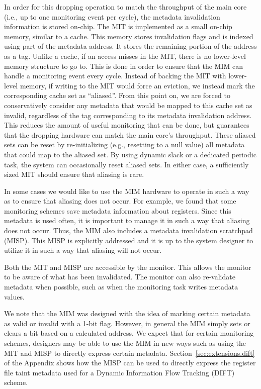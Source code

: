 In order for this dropping operation to match the throughput of the main core
(i.e., up to one monitoring event per cycle), the metadata invalidation
information is stored on-chip. The MIT is implemented as a small on-chip
memory, similar to a cache. This memory stores invalidation flags and is
indexed using part of the metadata address. It stores the remaining portion of
the address as a tag. Unlike a cache, if an access misses in the MIT, there is
no lower-level memory structure to go to. This is done in order to ensure that
the MIM can handle a monitoring event every cycle. Instead of backing the MIT
with lower-level memory, if writing to the MIT would force an eviction, we
instead mark the corresponding cache set as ``aliased''. From this point on, we
are forced to conservatively consider any metadata that would be mapped to this
cache set as invalid, regardless of the tag corresponding to its metadata
invalidation address. This reduces the amount of useful monitoring that can be
done, but guarantees that the dropping hardware can match the main core's
throughput. These aliased sets can be reset by re-initializing (e.g., resetting
to a null value) all metadata that could map to the aliased set. By using
dynamic slack or a dedicated periodic task, the system can occasionally reset
aliased sets. In either case, a sufficiently sized MIT should ensure that
aliasing is rare.

In some cases we would like to use the MIM hardware to operate in such a way as
to ensure that aliasing does not occur. For example, we found that some
monitoring schemes save metadata information about registers. Since this
metadata is used often, it is important to manage it in such a way that
aliasing does not occur. Thus, the MIM also includes a metadata invalidation
scratchpad (MISP). This MISP is explicitly addressed and it is up to the system
designer to utilize it in such a way that aliasing will not occur.

Both the MIT and MISP are accessible by the monitor. This allows the monitor to
be aware of what has been invalidated. The monitor can also re-validate
metadata when possible, such as when the monitoring task writes metadata
values.

We note that the MIM was designed with the idea of marking certain metadata as
valid or invalid with a 1-bit flag. However, in general the MIM simply sets or
clears a bit based on a calculated address. We expect that for certain
monitoring schemes, designers may be able to use the MIM in new ways such as
using the MIT and MISP to directly express certain metadata.
Section~\ref{sec:extensions.dift} of the Appendix shows how the MISP can be
used to directly express the register file taint metadata used for a Dynamic
Information Flow Tracking (DIFT) scheme.

